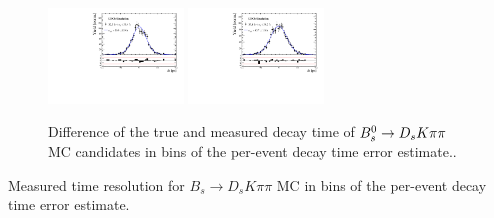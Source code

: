 \begin{figure}[h]
\includegraphics[height=!,width=0.32\textwidth]{figs/Resolution/SignalMC_bin_7.pdf}
\includegraphics[height=!,width=0.32\textwidth]{figs/Resolution/SignalMC_bin_8.pdf}
\caption{Difference of the true and measured decay time of ${{B}^0_{s}}\rightarrow{\ensuremath{{D}_{s}}}{\ensuremath{K}}{\ensuremath{\pi}}{\ensuremath{\pi}}$ MC candidates in bins of the per-event decay time error estimate..}
\label{fig:}
\end{figure}

\begin{table}[h]
\centering
\small
\caption{Measured time resolution for $B_s \to D_s K \pi \pi$ MC in bins of the per-event decay time error estimate.}

\label{table:ResoParamsMC}
\end{table}
\clearpage

